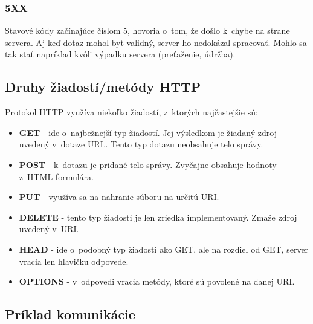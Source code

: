 \documentclass[zadani,slovak]{fitthesis}
\begin{document}
\label{5XX}
\subsubsection{5XX}
Stavové kódy začínajúce číslom 5, hovoria o~tom, že došlo k~chybe na strane servera. Aj keď dotaz mohol byť validný, server ho nedokázal spracovať. Mohlo sa tak stať napríklad kvôli výpadku servera (preťaženie, údržba).

\subsection{Druhy žiadostí/metódy HTTP}
Protokol HTTP využíva niekoľko žiadostí, z~ktorých najčastejšie sú:
\begin{itemize}
    \item \textbf{GET} - ide o~najbežnejší typ žiadostí. Jej výsledkom je žiadaný zdroj uvedený v~dotaze URL. Tento typ dotazu neobsahuje telo správy.
    \item \textbf{POST} - k~dotazu je pridané telo správy. Zvyčajne obsahuje hodnoty z~HTML formulára.
    \item \textbf{PUT} - využíva sa na nahranie súboru na určitú URI.
    \item \textbf{DELETE} - tento typ žiadosti je len zriedka implementovaný. Zmaže zdroj uvedený v~URI.
    \item \textbf{HEAD} - ide o~podobný typ žiadosti ako GET, ale na rozdiel od GET, server vracia len hlavičku odpovede.
    \item \textbf{OPTIONS} - v~odpovedi vracia metódy, ktoré sú povolené na danej URI.
\end{itemize}




\newpage

\subsection{Príklad komunikácie}
\end{document}
